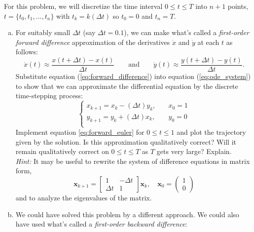 For this problem, we will discretize the time interval $0 \leq t \leq T$ into $n+1$ points, $ t = \{t_0, t_1, \dots, t_n\}$ with $t_k = k (\Delta t)$ so $t_0=0$ and $t_n = T$. 
\begin{enumerate}[(a)]
    \item For suitably small $\Delta t$ (say $\Delta t = 0.1$), we can make what's called a \textit{first-order forward difference} approximation of the derivatives $\dot{x}$ and $\dot{y}$ at each $t$ as follows:
    \begin{equation} 
    \label{eq:forward_difference}
    \dot{x}(t) \approx \frac{x(t + \Delta t) - x(t)}{\Delta t} \qquad \text{and} \qquad \dot{y}(t) \approx \frac{y(t + \Delta t) - y(t)}{\Delta t}.
    \end{equation}
     Substitute equation (\ref{eq:forward_difference}) into equation (\ref{eq:ode_system}) to show that we can approximate the differential equation by the discrete time-stepping process:
    \begin{equation}
    \label{eq:forward_euler}
    \begin{cases} x_{k+1} = x_k - (\Delta t) y_k, & \quad x_0 = 1\\  y_{k+1} = y_k + (\Delta t) x_k, & \quad y_0 = 0\\  \end{cases}
    \end{equation}
    Implement equation \ref{eq:forward_euler} for $0 \leq t \leq 1$ and plot the trajectory given by the solution. Is this approximation qualitatively correct? Will it remain qualitatively correct on $0 \leq t \leq T$ as $T$ gets very large? Explain.\\
    \textit{Hint:} It may be useful to rewrite the system of difference equations in matrix form,
    \begin{equation*}
    \bm{x}_{k+1} 
    = \begin{bmatrix} 1 & -\Delta t \\  \Delta t & 1\end{bmatrix} \bm{x}_k, \quad \bm{x}_0 = \begin{pmatrix} 1\\0 \end{pmatrix}
    \end{equation*}
    and to analyze the eigenvalues of the matrix.
    \item We could have solved this problem by a different approach. We could also have used what's called a \textit{first-order backward difference}:

\end{enumerate}
